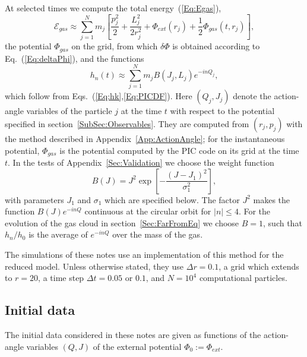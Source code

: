 At selected times we compute the total energy~(\ref{Eq:Egas}),
\begin{equation}
\mathcal{E}_{gas}\approx \sum\limits_{j=1}^N m_j\left[ \frac{p_j^2}{2} + \frac{L_j^2}{2r_j^2} + \Phi_{ext}(r_j) + \frac{1}{2}\Phi_{gas}(t,r_j) \right],
\label{Eq:EgasPIC}
\end{equation}
the potential $\Phi_{gas}$ on the grid, from which $\delta\Phi$ is obtained according to Eq.~(\ref{Eq:deltaPhi}), and the functions
\begin{equation}
h_n(t)\approx \sum\limits_{j=1}^N m_j B(J_j,L_j) e^{-inQ_j},
\label{Eq:hnPIC}
\end{equation}
which follow from Eqs.~(\ref{Eq:hk},\ref{Eq:PICDF}). Here $(Q_j,J_j)$ denote the action-angle variables of the particle $j$ at the time $t$ with respect to the potential specified in section~\ref{SubSec:Observables}. They are computed from $(r_j,p_j)$ with the method described in Appendix~\ref{App:ActionAngle}; for the instantaneous potential, $\Phi_{gas}$ is the potential computed by the PIC code on its grid at the time $t$. In the tests of Appendix~\ref{Sec:Validation} we choose the weight function
\begin{equation}
B(J) = J^2\exp\left[ -\frac{(J - J_1)^2}{\sigma_1^2} \right],
\label{Eq:BDef}
\end{equation}
with parameters $J_1$ and $\sigma_1$ which are specified below. The factor $J^2$ makes the function $B(J)e^{-inQ}$ continuous at the circular orbit for $|n|\leq 4$. For the evolution of the gas cloud in section~\ref{Sec:FarFromEq} we choose $B = 1$, such that $h_n/h_0$ is the average of $e^{-inQ}$ over the mass of the gas.

The simulations of these notes use an implementation of this method for the reduced model. Unless otherwise stated, they use $\Delta r = 0.1$, a grid which extends to $r = 20$, a time step $\Delta t = 0.05$ or $0.1$, and $N = 10^4$ computational particles. 


\subsection{Initial data}
\label{SubSec:QuietStart}

The initial data considered in these notes are given as functions of the action-angle variables $(Q,J)$ of the external potential $\Phi_0 := \Phi_{ext}$.

